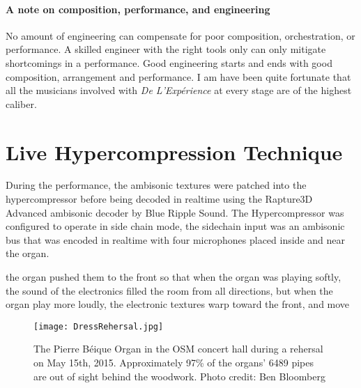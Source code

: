 \paragraph{A note on composition, performance, and engineering}
No amount of engineering can compensate for poor composition,
orchestration, or performance. A skilled engineer with the right tools
only can only mitigate shortcomings in a performance. Good engineering
starts and ends with good composition, arrangement and performance. I
am have been quite fortunate that all the musicians involved with
\textit{De L'Exp\'{e}rience} at every stage are of the highest
caliber.

\section{Live Hypercompression Technique}
\label{sec:live-hyperc-techn}
During the performance, the ambisonic textures were patched into the
hypercompressor before being decoded in realtime using the Rapture3D
Advanced ambisonic decoder by Blue Ripple
Sound.
The Hypercompressor was configured to operate in side chain mode, the
sidechain input was an ambisonic bus that was encoded in realtime with
four microphones placed inside and near the organ.



the organ pushed them to the front so that when the organ was playing
softly, the sound of the electronics filled the room from all
directions, but when the organ play more loudly, the electronic
textures warp toward the front, and move

\begin{figure*}[]
  \texttt{[image: DressRehersal.jpg]}
  \caption{The Pierre B\'{e}ique Organ in the OSM concert hall during
    a rehersal on May 15th, 2015. Approximately 97\% of the organs'
    6489 pipes are out of sight behind the woodwork. Photo credit: Ben
    Bloomberg}
  \label{fig:le-corbusier-sketch}
\end{figure*}


